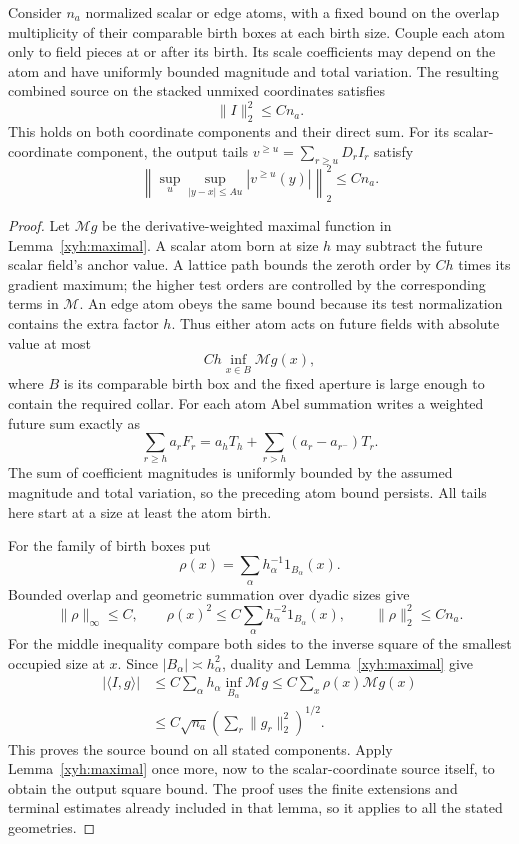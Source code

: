 \begin{lemma}\label{xyh:atoms}
Consider $n_a$ normalized scalar or edge atoms, with a fixed bound
on the overlap multiplicity of their comparable birth boxes at
each birth size. Couple each atom only to field pieces at or after
its birth. Its scale coefficients may depend on the atom and have
uniformly bounded magnitude and total variation. The resulting
combined source on the stacked unmixed coordinates satisfies
\[
 \|I\|_2^2\le Cn_a.
\]
This holds on both coordinate components and their direct sum.
For its scalar-coordinate component, the output tails
$v^{\ge u}=\sum_{r\ge u}D_rI_r$ satisfy
\[
 \left\|\sup_u\sup_{|y-x|\le Au}|v^{\ge u}(y)|\right\|_2^2
 \le Cn_a.
\]
\end{lemma}
\begin{proof}
Let $\mathcal M g$ be the derivative-weighted maximal function in
Lemma~\ref{xyh:maximal}. A scalar atom born at size $h$ may subtract
the future scalar field's anchor value. A lattice path bounds the
zeroth order by $Ch$ times its gradient maximum; the higher test
orders are controlled by the corresponding terms in $\mathcal M$.
An edge atom obeys the same bound because its test normalization
contains the extra factor $h$. Thus either atom acts on future
fields with absolute value at most
\[
 Ch\inf_{x\in B}\mathcal M g(x),
\]
where $B$ is its comparable birth box and the fixed aperture is
large enough to contain the required collar. For each atom Abel
summation writes a weighted future sum exactly as
\[
 \sum_{r\ge h}a_rF_r
 =a_hT_h+\sum_{r>h}(a_r-a_{r^-})T_r.
\]
The sum of coefficient magnitudes is uniformly bounded by the
assumed magnitude and total variation, so the preceding atom bound
persists. All tails here start at a size at least the atom birth.

For the family of birth boxes put
\[
 \rho(x)=\sum_\alpha h_\alpha^{-1}1_{B_\alpha}(x).
\]
Bounded overlap and geometric summation over dyadic sizes give
\[
 \|\rho\|_\infty\le C,\qquad
 \rho(x)^2\le C\sum_\alpha h_\alpha^{-2}1_{B_\alpha}(x),
 \qquad \|\rho\|_2^2\le Cn_a.
\]
For the middle inequality compare both sides to the inverse square
of the smallest occupied size at $x$. Since $|B_\alpha|\asymp
h_\alpha^2$, duality and Lemma~\ref{xyh:maximal} give
\[
 \begin{split}
 |\langle I,g\rangle|
 &\le C\sum_\alpha h_\alpha
                 \inf_{B_\alpha}\mathcal M g
 \le C\sum_x\rho(x)\mathcal M g(x)\\
 &\le C\sqrt{n_a}
       \left(\sum_r\|g_r\|_2^2\right)^{1/2}.
 \end{split}
\]
This proves the source bound on all stated components. Apply
Lemma~\ref{xyh:maximal} once more, now to the scalar-coordinate
source itself, to obtain the output square bound. The proof uses
the finite extensions and terminal estimates already included in
that lemma, so it applies to all the stated geometries.
\end{proof}


